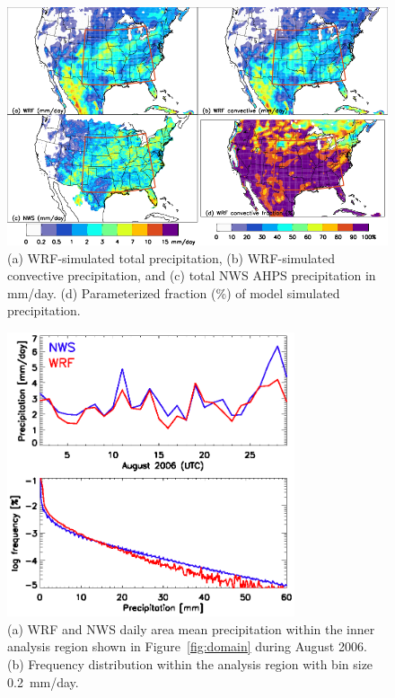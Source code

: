  \begin{figure}
 \noindent\includegraphics[width=40pc]{figures/precip_sd.png}
 \caption{(a) WRF-simulated total precipitation, (b) WRF-simulated convective precipitation, and
(c) total NWS AHPS precipitation in mm/day. (d) Parameterized fraction (\%) of model simulated
precipitation.}
 \label{fig:precip_sd}
 \end{figure}

 \begin{figure}
 \noindent\includegraphics[width=20pc]{figures/precip_ts.eps} %
 \caption{(a) WRF and NWS daily area mean precipitation within the inner analysis region shown
in Figure~\ref{fig:domain} during August 2006. (b) Frequency distribution within the analysis region
with bin size 0.2~mm/day.}
 \label{fig:precip_ts}
 \end{figure}

